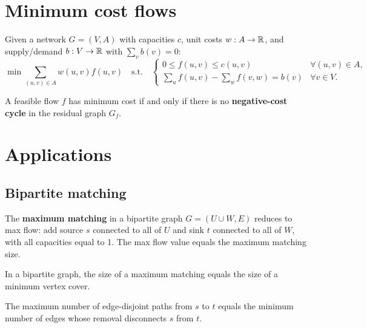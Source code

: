 \section{Minimum cost flows}

\begin{definition}
Given a network $G = (V, A)$ with capacities $c$, unit costs $w : A \to \mathbb{R}$,
and supply/demand $b : V \to \mathbb{R}$ with $\sum_{v} b(v) = 0$:
\[
  \min \sum_{(u,v) \in A} w(u,v) f(u,v) \quad \text{s.t.} \quad
  \begin{cases}
    0 \leq f(u,v) \leq c(u,v) & \forall (u,v) \in A, \\
    \displaystyle\sum_{u} f(u,v) - \sum_{w} f(v,w) = b(v)
    & \forall v \in V.
  \end{cases}
\]
\end{definition}

\begin{theorem}
A feasible flow $f$ has minimum cost if and only if there is no
\textbf{negative-cost cycle} in the residual graph $G_f$.
\end{theorem}

\section{Applications}

\subsection{Bipartite matching}

\begin{proposition}
The \textbf{maximum matching} in a bipartite graph $G = (U \cup W, E)$ reduces
to max flow: add source $s$ connected to all of $U$ and sink $t$ connected to
all of $W$, with all capacities equal to 1. The max flow value equals the
maximum matching size.
\end{proposition}

\begin{theorem}
In a bipartite graph, the size of a maximum matching equals the size of a
minimum vertex cover.
\end{theorem}

\begin{proposition}
The maximum number of edge-disjoint paths from $s$ to $t$ equals the minimum
number of edges whose removal disconnects $s$ from $t$.
\end{proposition}

